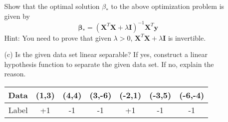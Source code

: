 \documentclass[10pt]{article}
\begin{document}
\begin{enumerate}[1.]
\begin{itemize}
			Show that the optimal solution $\beta_*$ to the above optimization problem is given by
			\[\mathbf{\beta}_* = (\mathbf{X}^T\mathbf{X} + \lambda \mathbf{I})^{-1}\mathbf{X}^T\mathbf{y}\]
			Hint: You need to prove that given $\lambda>0$, $\mathbf{X}^T\mathbf{X} + \lambda \mathbf{I}$ is invertible. 
			\item[(c)] Is the given data set linear separable? If yes, construct a linear hypothesis function to separate the given data set. If no, explain the reason. 
			
			\begin{table}[h]
				\centering
				\begin{tabular}{c|cccccc}
					Data & (1,3) & (4,4) & (3,-6) & (-2,1) & (-3,5) & (-6,-4) \\ \hline
					Label & +1 & -1 & -1 & +1 & -1 & -1
				\end{tabular}
				\label{tab:my_label}
			\end{table}
	      \end{itemize}
      	  
      	  
      	  
      	  \newpage


\end{enumerate}
\end{document}
